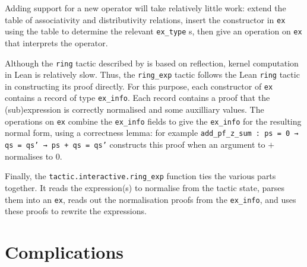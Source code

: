 \documentclass{llncs}
\newcommand{\lean}[1]{\texttt{#1}\xspace} %
\newcommand{\ex}{\lean{ex}}
\newcommand{\ringexp}{\lean{ring\_exp}}
\begin{document}

Adding support for a new operator will take relatively little work:
extend the table of associativity and distributivity relations,
insert the constructor in \ex using the table to determine the relevant \lean{ex\_type}s,
then give an operation on \ex that interprets the operator.

Although the \lean{ring} tactic described by \citeauthor{ring-tactic} is based on reflection,
kernel computation in Lean is relatively slow.
Thus, the \ringexp tactic follows the Lean \lean{ring} tactic in constructing its proof directly.
For this purpose, each constructor of \ex contains a record of type \lean{ex\_info}.
Each record contains a proof that the (sub)expression is correctly normalised and some auxilliary values.
The operations on \ex combine the \lean{ex\_info} fields to give the \lean{ex\_info} for the resulting normal form,
using a correctness lemma: for example \lean{add\_pf\_z\_sum : ps = 0 → qs = qs' → ps + qs = qs'} constructs this proof when an argument to $+$ normalises to $0$.

Finally, the \lean{tactic.interactive.ring\_exp} function ties the various parts together.
It reads the expression(s) to normalise from the tactic state,
parses them into an \ex,
reads out the normalisation proofs from the \lean{ex\_info},
and uses these proofs to rewrite the expressions.

\section{Complications}
\end{document}
